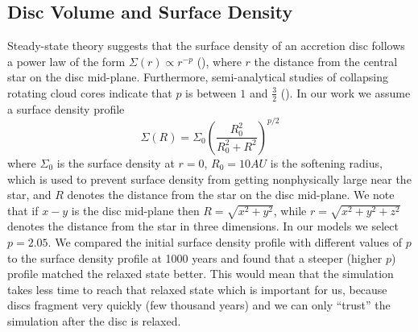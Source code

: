\documentclass[aps,prb,twocolumn,superscriptaddress,floatfix,longbibliography]{revtex4-2}
\begin{document}
\subsection{Disc Volume and Surface Density}
Steady-state theory suggests that the surface density of an accretion disc follows a power law of the form $\Sigma (r) \propto r^{-p}$ (\cite{armitage2020astrophysics}), where $r$ the distance from the central star on the disc mid-plane. Furthermore, semi-analytical studies of collapsing rotating cloud cores indicate that $p$ is between $1$ and $\frac{3}{2}$  (\cite{lin1990formation}). In our work we assume a surface density profile
\begin{equation}\label{eq:surface density}
    \Sigma (R) = \Sigma_0 (\frac{R_0^2}{R_0^2 + R^2})^{p/2}
\end{equation}
where $\Sigma_0$ is the surface density at $r=0$, $R_0 = 10 AU$ is the softening radius, which is used to prevent surface density from getting nonphysically large near the star, and $R$ denotes the distance from the star on the disc mid-plane. We note that if $x-y$ is the disc mid-plane then $R=\sqrt{x^2 + y^2}$, while $r=\sqrt{x^2 + y^2 +z^2}$ denotes the distance from the star in three dimensions. In our models we select $p=2.05$. We compared the initial surface density profile with different values of $p$ to the surface density profile at 1000 years and found that a steeper (higher $p$) profile matched the relaxed state better. This would mean that the simulation takes less time to reach that relaxed state which is important for us, because discs fragment very quickly (few thousand years)  and we can only ``trust'' the simulation after the disc is relaxed.
\end{document}

